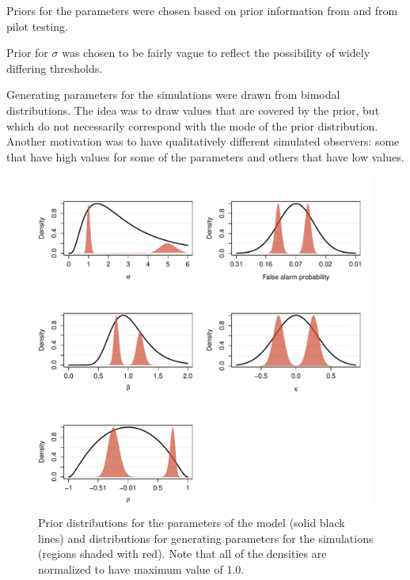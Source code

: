 \documentclass{article}\usepackage{knitr}
\begin{document}
Priors for the parameters were chosen based on prior information from \citet{silbert2009} and from pilot testing. 

Prior for $\sigma$ was chosen to be fairly vague to reflect the possibility of widely differing thresholds.

Generating parameters for the simulations were drawn from bimodal distributions. The idea was to draw values that are covered by the prior, but which do not necessarily correspond with the mode of the prior distribution. Another motivation was to have qualitatively different simulated observers: some that have high values for some of the parameters and others that have low values.

\begin{figure}[!htb]
\centering
\begin{knitrout}
\color{fgcolor}
\includegraphics[width=\maxwidth]{figure/unnamed-chunk-15-1} 

\end{knitrout}

\caption{Prior distributions for the parameters of the model (solid black lines) and distributions for generating parameters for the simulations (regions shaded with red). Note that all of the densities are normalized to have maximum value of 1.0.}
\label{fig:priors}
\end{figure}
\end{document}
